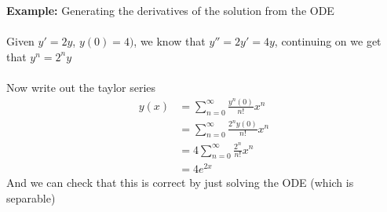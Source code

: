 \documentclass{article}
\begin{document}
\begin{example} 
\textbf{Example:} Generating the derivatives of the solution from the ODE \\
~\\
Given $y'=2y$, $y(0) = 4)$, we know that $y'' = 2y' = 4y$, continuing on we get that $y^n = 2^n y$ \\
~\\
Now write out the taylor series
\begin{align}
	y(x) &= \sum_{n=0}^{\infty} \frac{y^n(0)}{n!}x^n \\
	     &= \sum_{n=0}^{\infty} \frac{2^n y(0)}{n!}x^n  \\
	     &= 4\sum_{n=0}^{\infty} \frac{2^n}{n!}x^n \\
	     &= 4e^{2x}
\end{align}
And we can check that this is correct by just solving the ODE (which is separable)
\end{example}
\end{document}

